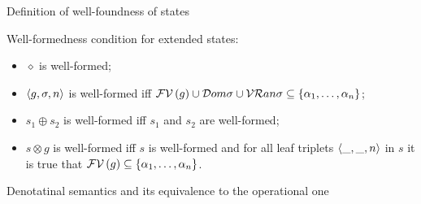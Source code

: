 \colorbox{red!20}{\parbox{\textwidth}{Definition of well-foundness of states}}

\begin{definition}
  Well-formedness condition for extended states:
  
  \begin{itemize}
  \item $\diamond$ is well-formed;
  \item $\left<{g, \sigma, n}\right>$ is well-formed iff $\mathcal{FV}\,({g})\cup\mathcal{D}om{\sigma}\cup\mathcal{VR}an{\sigma}\subseteq\{\alpha_1,\dots,\alpha_n\}$;
  \item $s_1\oplus s_2$ is well-formed iff $s_1$ and $s_2$ are well-formed;
  \item $s\otimes g$ is well-formed iff $s$ is well-formed and for all leaf triplets $\left<{\_,\_,n}\right>$ in $s$ it is true that $\mathcal{FV}\,({g})\subseteq\{\alpha_1,\dots,\alpha_n\}$.
  \end{itemize}
  
\end{definition}
\colorbox{red!20}{\parbox{\textwidth}{Denotatinal semantics and its equivalence to the operational one}}
